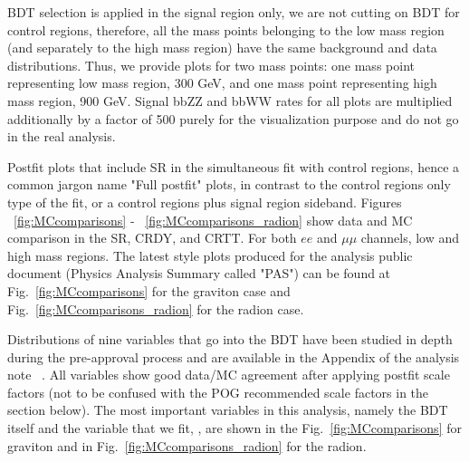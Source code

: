 BDT selection is applied in the signal region only, we are not cutting on BDT for control regions, therefore, all the mass
points belonging to the low mass region (and separately to the high mass region) have the same background and data distributions. Thus, we provide plots for two mass points: one mass point representing low mass region, 300 GeV, and one mass point representing high mass region, 900 GeV. 
Signal bbZZ and bbWW rates for all plots are multiplied additionally by a factor of 500 purely for the visualization purpose and do not go in the real analysis. 


Postfit plots that include SR in the simultaneous fit with control regions, hence a common jargon name "Full postfit" plots, in contrast to the control regions only type of the fit, or a control regions plus signal region sideband. Figures ~\ref{fig:MCcomparisons} - ~\ref{fig:MCcomparisons_radion} show data and MC comparison in the SR, CRDY, and CRTT. For both $ee$ and $\mu\mu$ channels, low and high mass regions. The latest style plots produced for the analysis public document (Physics Analysis Summary called "PAS") can be found at Fig.~\ref{fig:MCcomparisons} for the graviton case and Fig.~\ref{fig:MCcomparisons_radion} for the radion case. 



Distributions of nine variables that go into the BDT have been studied in depth during the pre-approval process and are available in the Appendix of the analysis note ~\cite{bbZZAN}. All variables show good data/MC agreement after applying postfit scale factors (not to be confused with the POG recommended scale factors in the section below). %
The most important variables in this analysis, namely the BDT itself and the variable that we fit, \mTHH, are shown in the Fig.~\ref{fig:MCcomparisons} for graviton and in Fig.~\ref{fig:MCcomparisons_radion} for the radion. 


